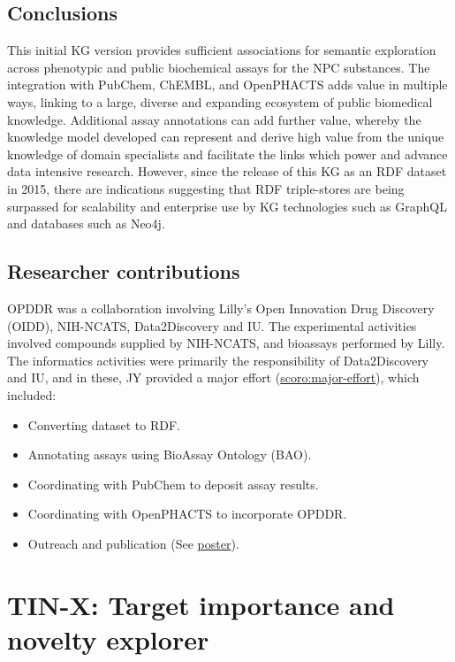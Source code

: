 \subsection{Conclusions}

This initial KG version provides sufficient associations for semantic exploration across phenotypic and public biochemical assays for the NPC substances.  The integration with PubChem, ChEMBL, and OpenPHACTS adds value in multiple ways, linking to a large, diverse and expanding ecosystem of public biomedical knowledge.  Additional assay annotations can add further value, whereby the knowledge model developed can represent and derive high value from the unique knowledge of domain specialists and facilitate the links which power and advance data intensive research. However, since the release of this KG as an RDF dataset in 2015, there are indications suggesting that RDF triple-stores are being surpassed for scalability and enterprise use by KG technologies such as GraphQL and databases such as Neo4j. 

\subsection{Researcher contributions}

OPDDR was a collaboration involving Lilly's Open Innovation Drug Discovery (OIDD), NIH-NCATS, Data2Discovery and IU. The experimental activities involved compounds supplied by NIH-NCATS, and bioassays performed by Lilly. The informatics activities were primarily the responsibility of Data2Discovery and IU, and in these, JY provided a major effort (\href{http://purl.org/spar/scoro/major-effort}{scoro:major-effort}), which included: 

\begin{itemize}[topsep=0pt,itemsep=0pt,partopsep=0pt,parsep=0pt]
    \item Converting dataset to RDF.
    \item Annotating assays using BioAssay Ontology (BAO).
    \item Coordinating with PubChem to deposit assay results.
    \item Coordinating with OpenPHACTS to incorporate OPDDR.
    \item Outreach and publication (See \href{https://zenodo.org/record/4844529}{poster}).
\end{itemize}

\newpage

\section{TIN-X: Target importance and novelty explorer}
\label{section:tinx}

